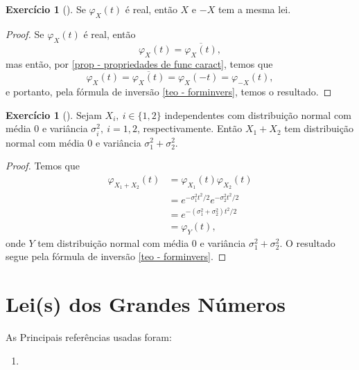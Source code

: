 \documentclass[12pt,a4paper,oneside]{book}
\theoremstyle{definition}
\newtheorem{xca}[theorem]{Exerc\'icio}
\theoremstyle{remark}
\numberwithin{equation}{section}
\begin{document}
\begin{xca}[\cite{durrett}]
Se $\varphi_X(t)$ é real, então $X$ e $-X$ tem a mesma lei.
\end{xca}
\begin{proof}
Se $\varphi_X(t)$ é real, então
$$\varphi_X(t) = \overline{\varphi_X(t)}, $$
mas então, por \ref{prop - propriedades de func caract}, temos que
$$\varphi_X(t) =\overline{\varphi_X(t)}= \varphi_X(-t) = \varphi_{-X}(t),  $$
e portanto, pela fórmula de inversão \ref{teo - forminvers}, temos o resultado.
\end{proof}

\begin{xca}[\cite{durrett}]
Sejam $X_i,\ i\in\{1,2\}$ independentes com distribuição normal com média 0 e variância $\sigma^2_i,\ i=1,2$, respectivamente. Então $X_1+X_2$ tem distribuição normal com média 0 e variância $\sigma_1^2 + \sigma^2_2.$
\end{xca}
\begin{proof}
Temos que
\begin{align*}
\varphi_{X_1+X_2}(t)  &= \varphi_{X_1}(t)\varphi_{X_2}(t)\\
 &= e^{-\sigma_1^2t^2/2}e^{-\sigma_2^2t^2/2}  \\
 &= e^{-(\sigma_1^2+\sigma_2^2)t^2/2}  \\
 &= \varphi_Y(t),
\end{align*}
onde $Y$ tem distribuição normal com média 0 e variância $\sigma_1^2+\sigma_2^2$. O resultado segue pela fórmula de inversão \ref{teo - forminvers}.
\end{proof}







































\newpage

\chapter{Lei(s) dos Grandes Números}
\begin{tcolorbox}[colback = white]
As Principais referências usadas foram:
\begin{enumerate}
\item \cite{durrett}
\end{enumerate}
\end{tcolorbox}
\end{document}
